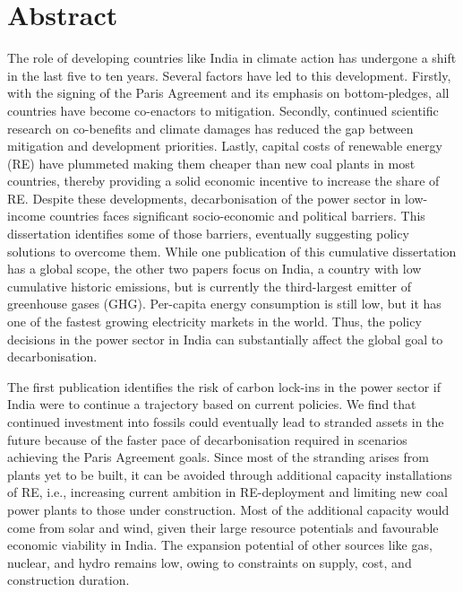 \documentclass[../thesis.tex]{subfiles}
\begin{document}
\chapter*{Abstract}
The role of developing countries like India in climate action has undergone a shift in the last five to ten years. Several factors have led to this development. Firstly, with the signing of the Paris Agreement and its emphasis on bottom-pledges, all countries have become co-enactors to mitigation. Secondly, continued scientific research on co-benefits and climate damages has reduced the gap between mitigation and development priorities. Lastly, capital costs of renewable energy (RE) have plummeted making them cheaper than new coal plants in most countries, thereby providing a solid economic incentive to increase the share of RE. Despite these developments, decarbonisation of the power sector in low-income countries faces significant socio-economic and political barriers. This dissertation identifies some of those barriers, eventually suggesting policy solutions to overcome them. While one publication of this cumulative dissertation has a global scope, the other two papers focus on India, a country with low cumulative historic emissions, but is currently the third-largest emitter of greenhouse gases (GHG). Per-capita energy consumption is still low, but it has one of the fastest growing electricity markets in the world. Thus, the policy decisions in the power sector in India can substantially affect the global goal to decarbonisation.

The first publication identifies the risk of carbon lock-ins in the power sector if India were to continue a trajectory based on current policies. We find that continued investment into fossils could eventually lead to stranded assets in the future because of the faster pace of decarbonisation required in scenarios achieving the Paris Agreement goals. Since most of the stranding arises from plants yet to be built, it can be avoided through additional capacity installations of RE, i.e., increasing current ambition in RE-deployment and limiting new coal power plants to those under construction. Most of the additional capacity would come from solar and wind, given their large resource potentials and favourable economic viability in India. The expansion potential of other sources like gas, nuclear, and hydro remains low, owing to constraints on supply, cost, and construction duration.
\end{document}
